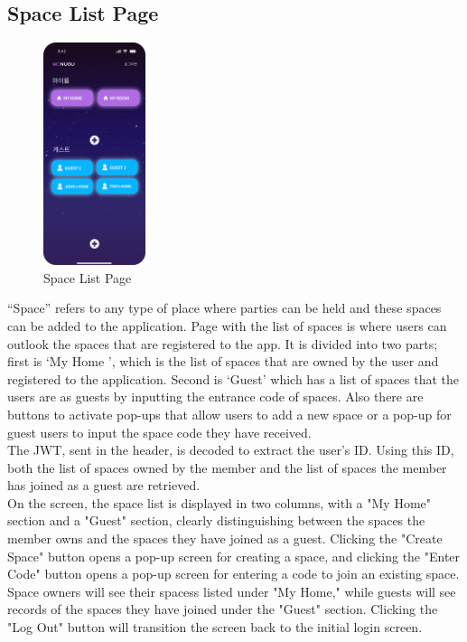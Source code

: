 \documentclass[conference]{IEEEtran}
\begin{document}
    \subsection{Space List Page}
         \begin{figure}[htbp]
        \centerline{\includegraphics[width=3cm]{Images/screen/3_Space Selection.png}}
        \caption{Space List Page}
        \label{fig}
        \end{figure}
        “Space” refers to any type of place where parties can be held and these spaces can be added to the application. Page with the list of spaces is where users can outlook the spaces that are registered to the app. It is divided into two parts; first is ‘My Home ', which is the list of spaces that are owned by the user and registered to the application. Second is ‘Guest’ which has a list of spaces that the users are as guests by inputting the entrance code of spaces. Also there are buttons to activate pop-ups that allow users to add a new space or a pop-up for guest users to input the space code they have received.\\
        The JWT, sent in the header, is decoded to extract the user's ID. Using this ID, both the list of spaces owned by the member and the list of spaces the member has joined as a guest are retrieved.\\
        On the screen, the space list is displayed in two columns, with a "My Home" section and a "Guest" section, clearly distinguishing between the spaces the member owns and the spaces they have joined as a guest.  Clicking the "Create Space" button opens a pop-up screen for creating a space, and clicking the "Enter Code" button opens a pop-up screen for entering a code to join an existing space. Space owners will see their spacess listed under "My Home," while guests will see records of the spaces they have joined under the "Guest" section.  Clicking the "Log Out" button will transition the screen back to the initial login screen.
\end{document}
